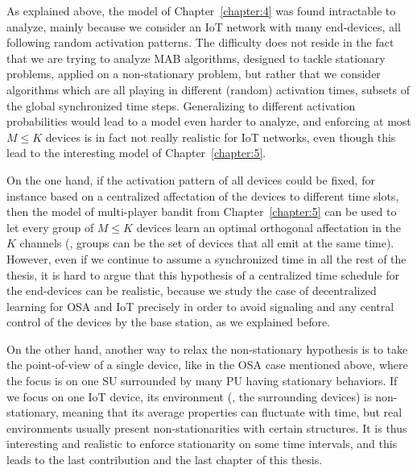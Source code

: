 As explained above, the model of Chapter~\ref{chapter:4} was found intractable to analyze, mainly because we consider an IoT network with many end-devices, all following random activation patterns.
The difficulty does not reside in the fact that we are trying to analyze MAB algorithms, designed to tackle stationary problems, applied on a non-stationary problem,
but rather that we consider algorithms which are all playing in different (random) activation times, subsets of the global synchronized time steps.
Generalizing to different activation probabilities would lead to a model even harder to analyze, and enforcing at most $M \leq K$ devices is in fact not really realistic for IoT networks, even though this lead to the interesting model of Chapter~\ref{chapter:5}.

On the one hand, if the activation pattern of all devices could be fixed, for instance based on a centralized affectation of the devices to different time slots, then the model of multi-player bandit from Chapter~\ref{chapter:5} can be used to let every group of $M \leq K$ devices learn an optimal orthogonal affectation in the $K$ channels (\eg, groups can be the set of devices that all emit at the same time).
%
However, even if we continue to assume a synchronized time in all the rest of the thesis,
it is hard to argue that this hypothesis of a centralized time schedule for the end-devices can be realistic, because we study the case of decentralized learning for OSA and IoT precisely in order to avoid signaling and any central control of the devices by the base station, as we explained before.

On the other hand, another way to relax the non-stationary hypothesis is to take the point-of-view of a single device, like in the OSA case mentioned above, where the focus is on one SU surrounded by many PU having stationary behaviors.
If we focus on one IoT device, its environment (\ie, the surrounding devices) is non-stationary, meaning that its average properties can fluctuate with time, but real environments usually present non-stationarities with certain structures.
%
It is thus interesting and realistic to enforce stationarity on some time intervals, and this leads to the last contribution and the last chapter of this thesis.


